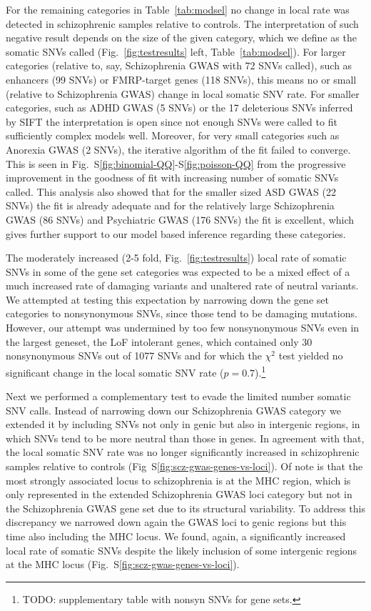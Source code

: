 \documentclass[letterpaper]{article}
\begin{document}
For the remaining categories in Table~\ref{tab:modsel} no change in local rate
was detected in schizophrenic samples relative to controls.  The
interpretation of such negative result depends on the size of the given
category, which we define as the somatic SNVs called
(Fig.~\ref{fig:testresults} left, Table~\ref{tab:modsel}).  For larger
categories (relative to, say, Schizophrenia GWAS with 72 SNVs called), such as
enhancers (99 SNVs) or FMRP-target genes (118 SNVs), this means no or small
(relative to Schizophrenia GWAS) change in local somatic SNV rate.  For
smaller categories, such as ADHD GWAS (5 SNVs) or the 17 deleterious SNVs
inferred by SIFT the interpretation is open since not enough SNVs were
called to fit sufficiently complex models well.  Moreover, for very small
categories such as Anorexia GWAS (2 SNVs), the iterative algorithm of the fit
failed to converge.  This is seen in
Fig.~S\ref{fig:binomial-QQ}-S\ref{fig:poisson-QQ} from the progressive
improvement in the goodness of fit with increasing number of somatic SNVs
called.  This analysis also showed that for the smaller sized ASD GWAS (22
SNVs) the fit is already adequate and for the relatively large Schizophrenia
GWAS (86 SNVs) and Psychiatric GWAS (176 SNVs) the fit is excellent, which
gives further support to our model based inference regarding these categories.

The moderately increased (2-5 fold, Fig.~\ref{fig:testresults}) local rate of
somatic SNVs in some of the gene set categories was expected to be a mixed
effect of a much increased rate of damaging variants and unaltered rate of
neutral variants. We attempted at testing this expectation by narrowing down
the gene set categories to nonsynonymous SNVs, since those tend to be
damaging mutations.  However, our attempt was undermined by too few
nonsynonymous SNVs even in the largest geneset, the LoF intolerant genes,
which contained only 30 nonsynonymous SNVs out of 1077 SNVs and for which the
$\chi^2$ test yielded no significant change in the local somatic SNV rate ($p
= 0.7$).\footnote{TODO: supplementary table with nonsyn SNVs for gene sets.}

Next we performed a complementary test to evade the limited number somatic SNV
calls.  Instead of narrowing down our Schizophrenia GWAS category we extended
it by including SNVs not only in genic but also in intergenic regions, in
which SNVs tend to be more neutral than those in genes.  In agreement with
that, the local somatic SNV rate was no longer significantly increased in
schizophrenic samples relative to controls
(Fig~S\ref{fig:scz-gwas-genes-vs-loci}).  Of note is that the most strongly
associated locus to schizophrenia is at the MHC region, which is only
represented in the extended Schizophrenia GWAS loci category but not in the
Schizophrenia GWAS gene set due to its structural variability.  To address
this discrepancy we narrowed down again the GWAS loci to genic regions but
this time also including the MHC locus.  We found, again, a significantly
increased local rate of somatic SNVs despite the likely inclusion of some
intergenic regions at the MHC locus (Fig.~S\ref{fig:scz-gwas-genes-vs-loci}).
\end{document}
